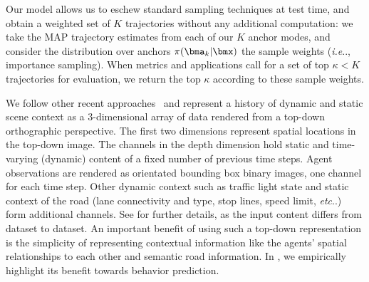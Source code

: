 \documentclass{article}
\makeatletter
\DeclareRobustCommand\onedot{\futurelet\@let@token\@onedot}
\def\@onedot{\ifx\@let@token.\else.\null\fi\xspace}
\def\ie{\emph{i.e}\onedot} \def\Ie{\emph{I.e}\onedot}
\def\etc{\emph{etc}\onedot} \def\vs{\emph{vs}\onedot}
\newcommand{\out}[1]{}
\newcommand{\supsecref}[1]{\secref{#1}}
\makeatother
\begin{document}
Our model allows us to eschew standard sampling techniques at test time, and obtain a weighted set of $K$ trajectories without any additional computation:  we take the MAP trajectory estimates from each of our $K$ anchor modes, and consider the distribution over anchors $\pi(\bma_k|\bmx)$ the sample weights (\ie, importance sampling).  When metrics and applications call for a set of top $\kappa < K$ trajectories for evaluation, we return the top $\kappa$ according to these sample weights.

\out{
\subsection{Sampling weighted trajectories}

To generate a discrete set of weighted trajectories, \ie, trajectories with scores that add up to one, we evaluate all $K$ clusters, yielding $K$ distinct trajectories $\setS$ in the form of $\bms^k=\bma^k + \mu(\bmx)^k$. Their likelihoods are given by the softmax functions $\pi(\bma^k|\bmx)$. Due to our choice of making the estimation of $\mu_t$ and $\Sigma_t$ conditionally independent in time, this model does not allow additional sampling. However, we usually choose a large enough $K$ so that we always end up with more trajectories than requested. If the model is required to return fewer trajectories than $K$, which is typically the case for most metrics discussed in the experiments, we simply sort the $K$ trajectories by their scores $\pi^k$. 
}





We follow other recent approaches~\cite{Casas18, Hong19, Bansal19} and represent a history of dynamic and static scene context as a 3-dimensional array of data rendered from a top-down orthographic perspective. The first two dimensions represent spatial locations in the top-down image. The channels in the depth dimension hold static and time-varying (dynamic) content of a fixed number of previous time steps. Agent observations are rendered as orientated bounding box binary images, one channel for each time step. Other dynamic context such as traffic light state and static context of the road (lane connectivity and type, stop lines, speed limit, \etc) form additional channels. See  for further details, as the input content differs from dataset to dataset. An important benefit of using such a top-down representation is the simplicity of representing contextual information like the agents' spatial relationships to each other and semantic road information. In \supsecref{sec:roadgraph}, we empirically highlight its benefit towards behavior prediction.
\end{document}
